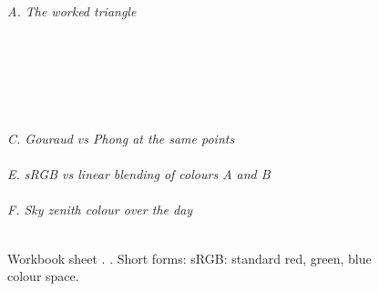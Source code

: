 \begin{figure}[htbp]
\centering
{\footnotesize\textit{A. The worked triangle}}\\[0.5mm]
\\[2mm]
\begin{minipage}[t]{0.6\linewidth}\\[0.5mm]
\end{minipage}\hfill
\begin{minipage}[t]{0.38\linewidth}\\[0.5mm]
\end{minipage}\\[2mm]
{\footnotesize\textit{C. Gouraud vs Phong at the same points}}\\[0.5mm]
\\[2mm]
{\footnotesize\textit{E. sRGB vs linear blending of colours A and B}}\\[0.5mm]
\\[2mm]
{\footnotesize\textit{F. Sky zenith colour over the day}}\\[0.5mm]
\\[1mm]
{\footnotesize\wbkey}
\caption{Workbook sheet . . Short forms: sRGB: standard red, green, blue colour space.}
\label{fig:wb-color}
\end{figure}

